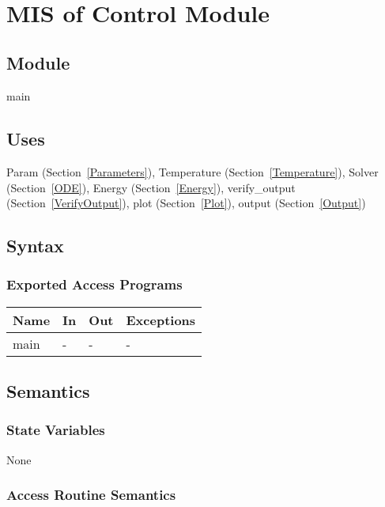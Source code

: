 \documentclass[12pt, titlepage]{article}
\begin{document}
\newpage
~\newpage

\section{MIS of Control Module} \label{Main}

\subsection{Module}

main

\subsection{Uses}

Param (Section~\ref{Parameters}), Temperature
(Section~\ref{Temperature}), Solver
(Section~\ref{ODE}), Energy (Section~\ref{Energy}), verify\_output (Section~\ref{VerifyOutput}), plot
(Section~\ref{Plot}), output (Section~\ref{Output})

\subsection{Syntax}

\subsubsection{Exported Access Programs}

\begin{center}
\begin{tabular}{p{2cm} p{4cm} p{4cm} p{2cm}}
\hline
\textbf{Name} & \textbf{In} & \textbf{Out} & \textbf{Exceptions} \\
\hline
main & - & - & - \\
\hline
\end{tabular}
\end{center}

\subsection{Semantics}

\subsubsection{State Variables}

None

\subsubsection{Access Routine Semantics}
\end{document}
